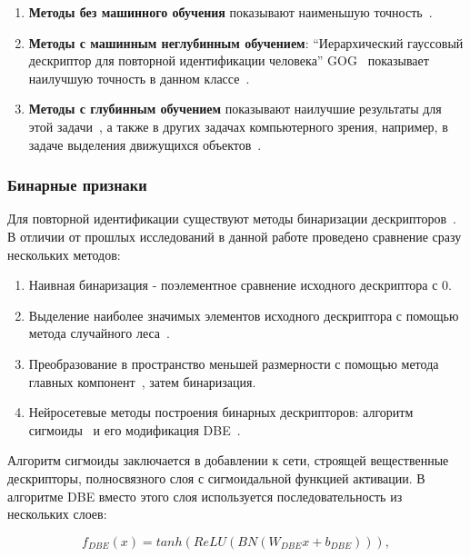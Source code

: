 \documentclass[a4paper,twoside,11pt]{article}
\numberwithin{equation}{section}
\begin{document}
\begin{enumerate}
    \item \textbf{Методы без машинного обучения} показывают наименьшую точность~\cite{karanam2016systematic,zheng2016person}.
    
    \item \textbf{Методы с машинным неглубинным обучением}: “Иерархический гауссовый дескриптор для повторной идентификации человека” GOG~\cite{matsukawa2016hierarchical} показывает наилучшую точность в данном классе~\cite{karanam2016systematic}.
    
    \item \textbf{Методы с глубинным обучением} показывают наилучшие результаты для этой задачи~\cite{hermans2017defense,zhang2017deep}, а также в других задачах компьютерного зрения, например, в задаче выделения движущихся объектов~\cite{morozov2016background}.
    
\end{enumerate}

\subsubsection{Бинарные признаки}

Для повторной идентификации существуют методы бинаризации дескрипторов~\cite{wu2017structured}. В отличии от прошлых исследований в данной работе проведено сравнение сразу нескольких методов:

\begin{enumerate}
    \item Наивная бинаризация - поэлементное сравнение исходного дескриптора с 0.
    \item Выделение наиболее значимых элементов исходного дескриптора с помощью метода случайного леса~\cite{breiman2001random}.
    \item Преобразование в пространство меньшей размерности с помощью метода главных компонент~\cite{halko2011finding}, затем бинаризация.
    \item Нейросетевые методы построения бинарных дескрипторов: алгоритм сигмоиды~\cite{lin2015deep} и его модификация DBE~\cite{liu2017end}.
\end{enumerate}

Алгоритм сигмоиды заключается в добавлении к сети, строящей вещественные дескрипторы, полносвязного слоя с сигмоидальной функцией активации. В алгоритме DBE вместо этого слоя используется последовательность из нескольких слоев:

$$f_{DBE}(x) = tanh(ReLU(BN(W_{DBE} x + b_{DBE}))),$$
\end{document}
